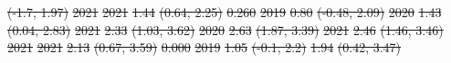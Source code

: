 \documentclass[
  letterpaper,
  DIV=11,
  numbers=noendperiod]{scrartcl}
\providecommand{\DIFdel}[1]{{\protect\color{red}\sout{#1}}}                      %
\providecommand{\DIFdelFL}[1]{\DIFdel{#1}} %
\begin{document}
\DIFdelFL{(-1.7, 1.97) }%
\DIFdelFL{\hspace{1em}2021 }%
\DIFdelFL{2021 }%
\DIFdelFL{1.44 }%
\DIFdelFL{(0.64, 2.25) }%
\DIFdelFL{0.260 }%
\DIFdelFL{2019 }%
\DIFdelFL{0.80 }%
\DIFdelFL{(-0.48, 2.09) }%
\DIFdelFL{2020 }%
\DIFdelFL{1.43 }%
\DIFdelFL{(0.04, 2.83) }%
\DIFdelFL{2021 }%
\DIFdelFL{2.33 }%
\DIFdelFL{(1.03, 3.62) }%
\DIFdelFL{2020 }%
\DIFdelFL{2.63 }%
\DIFdelFL{(1.87, 3.39) }%
\DIFdelFL{2021 }%
\DIFdelFL{2.46 }%
\DIFdelFL{(1.46, 3.46) }%
\DIFdelFL{\hspace{1em}2021 }%
\DIFdelFL{2021 }%
\DIFdelFL{2.13 }%
\DIFdelFL{(0.67, 3.59) }%
\DIFdelFL{0.000 }%
\DIFdelFL{2019 }%
\DIFdelFL{1.05 }%
\DIFdelFL{(-0.1, 2.2) }%
\DIFdelFL{1.94 }%
\DIFdelFL{(0.42, 3.47) }%
\end{document}
